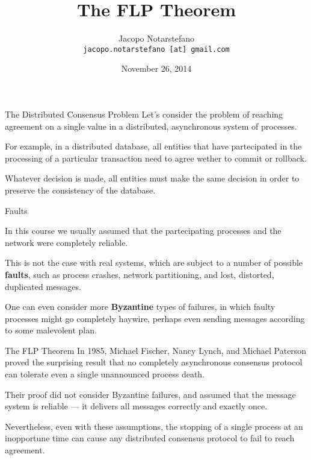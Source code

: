 \documentclass[12pt]{beamer}
\title{The FLP Theorem}
\author[Jacopo Notarstefano]{
  Jacopo Notarstefano\\
  \texttt{jacopo.notarstefano [at] gmail.com}
}
\date{November 26, 2014}
\begin{document}
  \begin{frame}[plain]
    \titlepage
  \end{frame}

  \begin{frame}{The Distributed Consensus Problem}
    Let's consider the problem of reaching agreement on a single value in a
    distributed, asynchronous system of processes.

    \vspace{0.25cm}

    For example, in a distributed database, all entities that have partecipated
    in the processing of a particular transaction need to agree wether to
    commit or rollback.

    \vspace{0.25cm}

    Whatever decision is made, all entities must make the same decision in
    order to preserve the consistency of the database.
  \end{frame}

  \begin{frame}{Faults}

    In this course we usually assumed that the partecipating processes and the
    network were completely reliable.

    \vspace{0.25cm}

    This is not the case with real systems, which are subject to a number of
    possible \textbf{faults}, such as process crashes, network partitioning,
    and lost, distorted, duplicated messages.

    \vspace{0.25cm}

    One can even consider more \textbf{Byzantine} types of failures, in which
    faulty processes might go completely haywire, perhaps even sending messages
    according to some malevolent plan.
  \end{frame}

  \begin{frame}{The FLP Theorem}
    In 1985, Michael Fischer, Nancy Lynch, and Michael Paterson proved the
    surprising result that no completely asynchronous consensus protocol can
    tolerate even a single unannounced process death.

    \vspace{0.25cm}

    Their proof did not consider Byzantine failures, and assumed that the
    message system is reliable — it delivers all messages correctly and exactly
    once.

    \vspace{0.25cm}

    Nevertheless, even with these assumptions, the stopping of a single process
    at an inopportune time can cause any distributed consensus protocol to fail
    to reach agreement.
  \end{frame}
\end{document}
